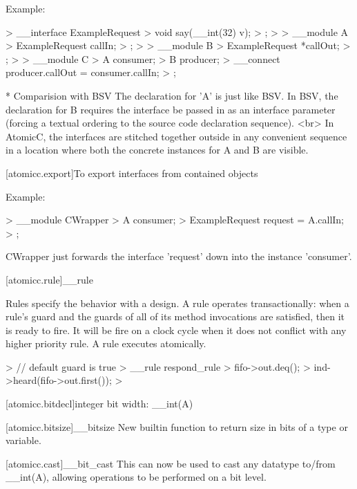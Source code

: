 Example:
\begin{codeblock}
>        __interface ExampleRequest {
>            void say(__int(32) v);
>        };
>
>        __module A {
>             ExampleRequest callIn;
>        };
>
>        __module B {
>            ExampleRequest *callOut;
>        };
>
>        __module C {
>            A consumer;
>            B producer;
>            __connect producer.callOut = consumer.callIn;
>        };
\end{codeblock}

* Comparision with BSV
    The declaration for 'A' is just like BSV.
    In BSV, the declaration for B requires the interface be passed in as
    an interface parameter (forcing a textual ordering to the source code
    declaration sequence).
    <br>
    In AtomicC, the interfaces are stitched together outside in any
    convenient sequence in a location where both the concrete instances
    for A and B are visible.

[atomicc.export]{To export interfaces from contained objects}

Example:
\begin{codeblock}
>        __module CWrapper {
>            A consumer;
>            ExampleRequest request = A.callIn;
>         };
\end{codeblock}

CWrapper just forwards the interface 'request' down into the instance 'consumer'.

[atomicc.rule]{__rule}

Rules specify the behavior with a design. A rule operates
transactionally: when a rule's guard and the guards of all of its
method invocations are satisfied, then it is ready to fire. It will be
fire on a clock cycle when it does not conflict with any higher
priority rule. A rule executes atomically.

\begin{codeblock}
>        // default guard is true
>        __rule respond_rule {
>            fifo->out.deq();
>            ind->heard(fifo->out.first());
>        }
\end{codeblock}

[atomicc.bitdecl]{integer bit width: __int(A)}


[atomicc.bitsize]{__bitsize}
New builtin function to return size in bits of a type or variable.

[atomicc.cast]{__bit_cast}
This can now be used to cast any datatype to/from __int(A), allowing operations to be performed on a bit level.


